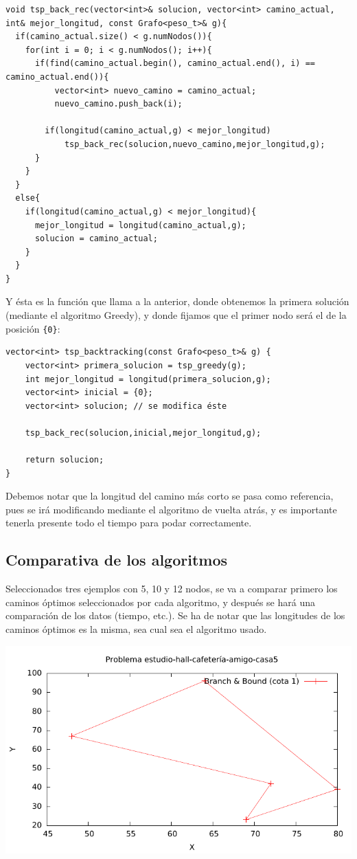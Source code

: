 \begin{lstlisting}
void tsp_back_rec(vector<int>& solucion, vector<int> camino_actual, int& mejor_longitud, const Grafo<peso_t>& g){
  if(camino_actual.size() < g.numNodos()){
    for(int i = 0; i < g.numNodos(); i++){
      if(find(camino_actual.begin(), camino_actual.end(), i) == camino_actual.end()){
	      vector<int> nuevo_camino = camino_actual;
	      nuevo_camino.push_back(i);

        if(longitud(camino_actual,g) < mejor_longitud)
	        tsp_back_rec(solucion,nuevo_camino,mejor_longitud,g);
      }
    }
  }
  else{
    if(longitud(camino_actual,g) < mejor_longitud){
      mejor_longitud = longitud(camino_actual,g);
      solucion = camino_actual;
    }
  }
}
\end{lstlisting}

Y ésta es la función que llama a la anterior, donde obtenemos la primera solución (mediante el algoritmo Greedy), y donde fijamos que el primer nodo será el de la posición \texttt{\{0\}}:

\begin{lstlisting}
vector<int> tsp_backtracking(const Grafo<peso_t>& g) {
	vector<int> primera_solucion = tsp_greedy(g);
	int mejor_longitud = longitud(primera_solucion,g);
	vector<int> inicial = {0};
	vector<int> solucion; // se modifica éste

	tsp_back_rec(solucion,inicial,mejor_longitud,g);

	return solucion;
}
\end{lstlisting}

Debemos notar que la longitud del camino más corto se pasa como referencia, pues se irá modificando mediante el algoritmo de vuelta atrás, y es importante tenerla presente todo el tiempo para podar correctamente.

\subsection{Comparativa de los algoritmos}

Seleccionados tres ejemplos con 5, 10 y 12 nodos, se va a comparar primero los caminos óptimos seleccionados por cada algoritmo, y después se hará una comparación de los datos (tiempo, etc.). Se ha de notar que las longitudes de los caminos óptimos es la misma, sea cual sea el algoritmo usado.

\includegraphics[width=15cm]{img/e-h-c-a-c5_tsp_1}

